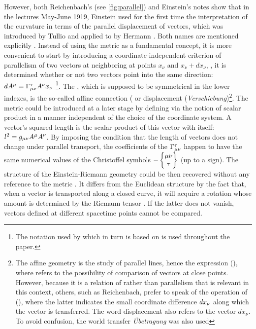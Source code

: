 \documentclass[draft]{article}
\newcommand{\xdx}{\ensuremath{x_\nu} and \ensuremath{x_\nu + dx_\nu}\xspace}
\begin{document}
However, both Reichenbach's (see \cref{fig:parallel}) and Einstein's notes show that in the lectures May-June 1919, Einstein used for the first time the interpretation of the curvature in terms of the parallel displacement of vectors, which was introduced by Tullio \citet{Levi-Civita1916} and applied to \rt by Hermann \citet{Weyl1918}. Both names are mentioned explicitly \citep[028-01-03, 33]{HR}. Instead of using the metric as a fundamental concept, it is more convenient to start by introducing a coordinate-independent criterion of parallelism of two vectors at neighboring at points \xdx, \ie, it is determined whether or not two vectors point into the same direction: $dA^\mu=\Gamma^\tau_{\mu\nu} A^\nu x_\nu$ \citep[028-01-03, 33]{HR}\footnote{The notation used by \citet{Reichenbach1928} which in turn is based on \citet{Eddington1923,Eddington1925} is used throughout the paper.}. The \Gtmn, which is supposed to be symmetrical in the lower indexes, is the so-called affine connection ( or displacement (\textit{Verschiebung})\footnote{The affine geometry is the study of parallel lines, \citet{Weyl1918b} hence the expression  (), where  refers to the possibility of comparison of vectors at close points. However, because it is a relation of  rather than parallelism that is relevant in this context, others, such as Reichenbach, prefer to speak of the operation of  (), where the latter indicates the small coordinate difference $dx_{\nu}$ along which the vector is transferred. The word displacement also refers to the vector $dx_\nu$. To avoid confusion, the world transfer \textit{Übetragung} was also used}. The metric could be introduced at a later stage by defining via the notion of scalar product in a manner independent of the choice of the coordinate system. A vector's squared length is the scalar product of this vector with itself: $l^2=g_{\mu\nu} A^\mu A^\nu$. By imposing the condition that the length of vectors does not change under parallel transport, the coefficients of the $\Gamma^\tau_{\mu\nu}$ happen to have the same numerical values of the Christoffel symbols $- \begin{Bmatrix} \mu \nu \\ \tau \end{Bmatrix}$ (up to a sign). The structure of the Einstein-Riemann geometry could be then recovered without any reference to the metric \gmn. It differs from the Euclidean structure by the fact that, when a vector is transported along a closed curve, it will acquire a rotation whose amount is determined by the Riemann tensor \riteg. If the latter does not vanish, vectors defined at different spacetime points cannot be compared.
\end{document}
